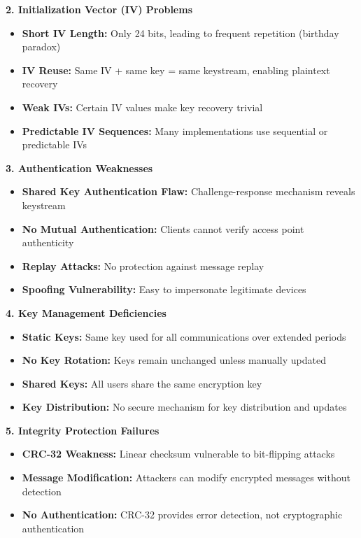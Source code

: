 \documentclass[12pt,a4paper]{article}
\begin{document}
\textbf{2. Initialization Vector (IV) Problems}
\begin{itemize}
    \item \textbf{Short IV Length:} Only 24 bits, leading to frequent repetition (birthday paradox)
    \item \textbf{IV Reuse:} Same IV + same key = same keystream, enabling plaintext recovery
    \item \textbf{Weak IVs:} Certain IV values make key recovery trivial
    \item \textbf{Predictable IV Sequences:} Many implementations use sequential or predictable IVs
\end{itemize}

\textbf{3. Authentication Weaknesses}
\begin{itemize}
    \item \textbf{Shared Key Authentication Flaw:} Challenge-response mechanism reveals keystream
    \item \textbf{No Mutual Authentication:} Clients cannot verify access point authenticity
    \item \textbf{Replay Attacks:} No protection against message replay
    \item \textbf{Spoofing Vulnerability:} Easy to impersonate legitimate devices
\end{itemize}

\textbf{4. Key Management Deficiencies}
\begin{itemize}
    \item \textbf{Static Keys:} Same key used for all communications over extended periods
    \item \textbf{No Key Rotation:} Keys remain unchanged unless manually updated
    \item \textbf{Shared Keys:} All users share the same encryption key
    \item \textbf{Key Distribution:} No secure mechanism for key distribution and updates
\end{itemize}

\textbf{5. Integrity Protection Failures}
\begin{itemize}
    \item \textbf{CRC-32 Weakness:} Linear checksum vulnerable to bit-flipping attacks
    \item \textbf{Message Modification:} Attackers can modify encrypted messages without detection
    \item \textbf{No Authentication:} CRC-32 provides error detection, not cryptographic authentication
\end{itemize}
\end{document}
